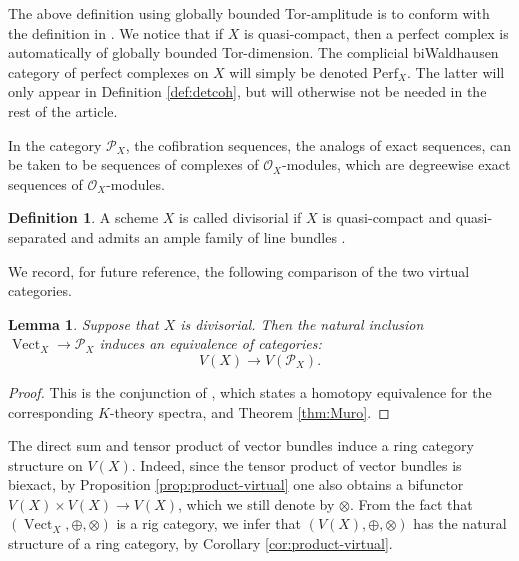 \documentclass[JEP,XML,SOM,Unicode,published]{cedram}
\theoremstyle{plain}
\newtheorem{lemma}[theorem]{Lemma}
\theoremstyle{definition}
\newtheorem{definition}[theorem]{Definition}
\newcommand{\Ocal}{\mathcal O}
\newcommand{\Pcal}{\mathcal P}
\DeclareMathOperator{\Vect}{Vect}
\begin{document}
The above definition using globally bounded Tor-amplitude is to conform with the definition in \cite[Def.\,3.1]{ThomasonTrobaugh}. We notice that if $X$ is quasi-compact, then a perfect complex is automatically of globally bounded Tor-dimension. The complicial biWaldhausen category of perfect complexes on $X$ will simply be denoted $\mathrm{Perf}_{X}$. The latter will only appear in Definition \ref{def:detcoh}, but will otherwise not be needed in the rest of the article.

In the category $\Pcal_X$, the cofibration sequences, \ie the analogs of exact sequences, can be taken to be sequences of complexes of $\Ocal_X$-modules, which are degreewise exact sequences of $\Ocal_X$-modules.

\begin{definition}\label{def:divisorial}
A scheme $X$ is called divisorial if $X$ is quasi-compact and quasi-separated and admits an ample family of line bundles \cite[Exp.\,II, Déf.\,2.2.4]{SGA6}.
\end{definition}

We record, for future reference, the following comparison of the two virtual categories.
\begin{lemma}\label{lemma:divisorial}
Suppose that $X$ is divisorial. Then the natural inclusion $\Vect_X \to \Pcal_X$ induces an equivalence of categories:
\begin{displaymath}
V(X) \to V(\Pcal_X).
\end{displaymath}
\end{lemma}
\begin{proof}
This is the conjunction of \cite[Cor.\,3.9 \& Prop.\,3.10]{ThomasonTrobaugh}, which states a homotopy equivalence for the corresponding $K$-theory spectra, and Theorem \ref{thm:Muro}.
\end{proof}

The direct sum and tensor product of vector bundles induce a ring category structure on $V(X)$. Indeed, since the tensor product of vector bundles is biexact, by Proposition \ref{prop:product-virtual} one also obtains a bifunctor $V(X) \times V(X)\to V(X)$, which we still denote by $\otimes$. From the fact that $(\Vect_{X},\oplus,\otimes)$ is a rig category, we infer that $(V(X),\oplus,\otimes)$ has the natural structure of a ring category, by Corollary \ref{cor:product-virtual}.
\end{document}

